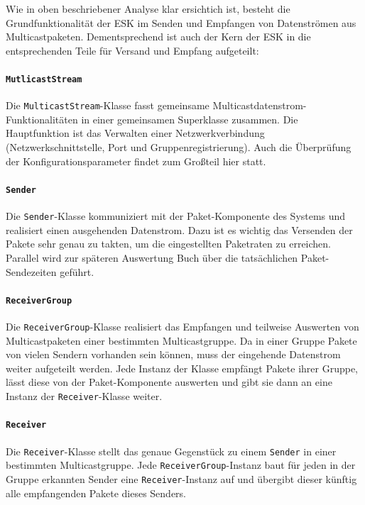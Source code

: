 Wie in oben beschriebener Analyse klar ersichtich ist, besteht die
Grundfunktionalität der ESK im Senden und Empfangen von Datenströmen aus
Multicastpaketen. Dementsprechend ist auch der Kern der ESK in die
entsprechenden Teile für Versand und Empfang aufgeteilt:

\paragraph{\texttt{MutlicastStream}}
Die \texttt{MulticastStream}-Klasse fasst gemeinsame
Multicastdatenstrom-Funktionalitäten in einer gemeinsamen Superklasse zusammen.
Die Hauptfunktion ist das Verwalten einer Netzwerkverbindung
(Netzwerkschnittstelle, Port und Gruppenregistrierung). Auch die Überprüfung der
Konfigurationsparameter findet zum Großteil hier statt.

\paragraph{\texttt{Sender}}
Die \texttt{Sender}-Klasse kommuniziert mit der Paket-Komponente des Systems und
realisiert einen ausgehenden Datenstrom. Dazu ist es wichtig das Versenden der
Pakete sehr genau zu takten, um die eingestellten Paketraten zu erreichen.
Parallel wird zur späteren Auswertung Buch über die tatsächlichen
Paket-Sendezeiten geführt.

\paragraph{\texttt{ReceiverGroup}}
Die \texttt{ReceiverGroup}-Klasse realisiert das Empfangen und teilweise
Auswerten von Multicastpaketen einer bestimmten Multicastgruppe. Da in einer
Gruppe Pakete von vielen Sendern vorhanden sein können, muss der eingehende
Datenstrom weiter aufgeteilt werden. Jede Instanz der Klasse empfängt Pakete
ihrer Gruppe, lässt diese von der Paket-Komponente auswerten und gibt sie dann
an eine Instanz der \texttt{Receiver}-Klasse weiter.

\paragraph{\texttt{Receiver}}
Die \texttt{Receiver}-Klasse stellt das genaue Gegenstück zu einem
\texttt{Sender} in einer bestimmten Multicastgruppe. Jede
\texttt{ReceiverGroup}-Instanz baut für jeden in der Gruppe erkannten Sender
eine \texttt{Receiver}-Instanz auf und übergibt dieser künftig alle empfangenden
Pakete dieses Senders.

